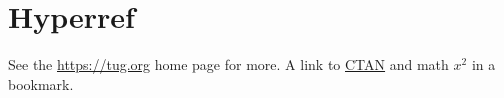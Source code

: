 \documentclass{article}
\begin{document}
\section{Hyperref}
See the \url{https://tug.org} home page for more.
A link to \href{https://www.ctan.org}{CTAN} and
\texorpdfstring{math $x^2$}{math x2} in a bookmark.
\end{document}
